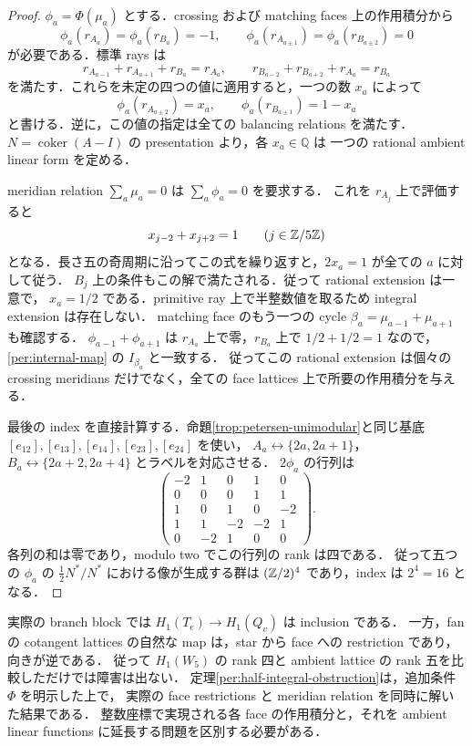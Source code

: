 \begin{proof}
$\phi_a=\Phi(\mu_a)$ とする．crossing および matching faces 上の作用積分から
\[
 \phi_a(r_{A_a})=\phi_a(r_{B_a})=-1,
 \qquad
 \phi_a(r_{A_{a\pm1}})=\phi_a(r_{B_{a\pm2}})=0
\]
が必要である．標準 rays は
\[
 r_{A_{a-1}}+r_{A_{a+1}}+r_{B_a}=r_{A_a},
 \qquad
 r_{B_{a-2}}+r_{B_{a+2}}+r_{A_a}=r_{B_a}
\]
を満たす．これらを未定の四つの値に適用すると，一つの数 $x_a$ によって
\begin{equation}\label{per:ambient-values}
 \phi_a(r_{A_{a\pm2}})=x_a,
 \qquad
 \phi_a(r_{B_{a\pm1}})=1-x_a
\end{equation}
と書ける．逆に，この値の指定は全ての balancing relations を満たす．
$N=\operatorname{coker}(A-I)$ の presentation より，各 $x_a\in\mathbb Q$ は
一つの rational ambient linear form を定める．

meridian relation $\sum_a\mu_a=0$ は $\sum_a\phi_a=0$ を要求する．
これを $r_{A_j}$ 上で評価すると
\[
 x_{j-2}+x_{j+2}=1\qquad(j\in\mathbb Z/5\mathbb Z)
\]
となる．長さ五の奇周期に沿ってこの式を繰り返すと，$2x_a=1$ が全ての $a$ に対して従う．
$B_j$ 上の条件もこの解で満たされる．従って rational extension は一意で，
$x_a=1/2$ である．primitive ray 上で半整数値を取るため integral extension は存在しない．
matching face のもう一つの cycle $\beta_a=\mu_{a-1}+\mu_{a+1}$ も確認する．
$\phi_{a-1}+\phi_{a+1}$ は $r_{A_a}$ 上で零，$r_{B_a}$ 上で $1/2+1/2=1$ なので，
\eqref{per:internal-map} の $I_{\beta_a}$ と一致する．
従ってこの rational extension は個々の crossing meridians だけでなく，全ての face lattices 上で所要の作用積分を与える．

最後の index を直接計算する．命題\ref{trop:petersen-unimodular}と同じ基底
$[e_{12}],[e_{13}],[e_{14}],[e_{23}],[e_{24}]$ を使い，
$A_a\leftrightarrow\{2a,2a+1\}$，$B_a\leftrightarrow\{2a+2,2a+4\}$ とラベルを対応させる．
$2\phi_a$ の行列は
\begin{equation}\label{per:half-matrix}
 \begin{pmatrix}
 -2&1&0&1&0\\
 0&0&0&1&1\\
 1&0&1&0&-2\\
 1&1&-2&-2&1\\
 0&-2&1&0&0
 \end{pmatrix}.
\end{equation}
各列の和は零であり，modulo two でこの行列の rank は四である．
従って五つの $\phi_a$ の $\tfrac12N^*/N^*$ における像が生成する群は
$(\mathbb Z/2)^4$ であり，index は $2^4=16$ となる．
\end{proof}

\begin{remark}
\label{per:variance}
実際の branch block では $H_1(T_e)\to H_1(Q_v)$ は inclusion である．
一方，fan の cotangent lattices の自然な map は，star から face への restriction であり，向きが逆である．
従って $H_1(W_5)$ の rank 四と ambient lattice の rank 五を比較しただけでは障害は出ない．
定理\ref{per:half-integral-obstruction}は，追加条件 $\Phi$ を明示した上で，
実際の face restrictions と meridian relation を同時に解いた結果である．
整数座標で実現される各 face の作用積分と，それを ambient linear functions に延長する問題を区別する必要がある．
\end{remark}
